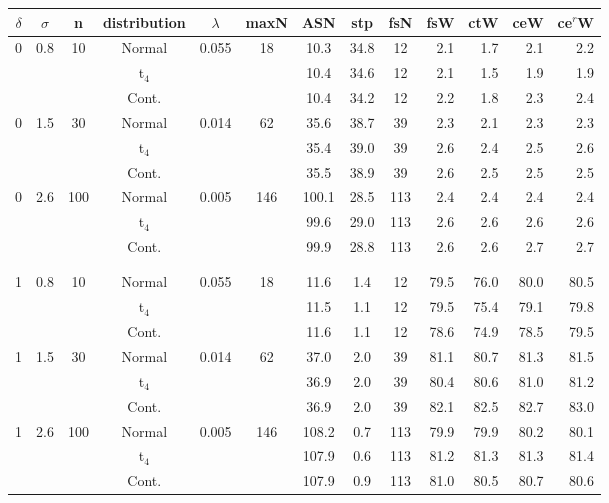 \begin{tabular}{cccccccccrrrr}

\toprule
\multicolumn{1}{c}{$\delta$}&\multicolumn{1}{c}{$\sigma$}&\multicolumn{1}{c}{n}&\multicolumn{1}{c}{distribution}&\multicolumn{1}{c}{$\lambda$}&\multicolumn{1}{c}{maxN}&\multicolumn{1}{c}{ASN}&\multicolumn{1}{c}{stp}&\multicolumn{1}{c}{fsN}&\multicolumn{1}{r}{fsW}&\multicolumn{1}{r}{ctW}&\multicolumn{1}{r}{ceW}&\multicolumn{1}{r}{ce$^r$W}\\
\midrule
0  &  0.8  &   10  &  Normal  &  0.055  &   18  &  10.3  &  34.8  &   12  &  2.1  &  1.7  &  2.1  &  2.2\\
   &     &     &  t$_4$  &     &     &  10.4  &  34.6  &   12  &  2.1  &  1.5  &  1.9  &  1.9\\
   &     &     &  Cont.  &     &     &  10.4  &  34.2  &   12  &  2.2  &  1.8  &  2.3  &  2.4\\
0  &  1.5  &   30  &  Normal  &  0.014  &   62  &  35.6  &  38.7  &   39  &  2.3  &  2.1  &  2.3  &  2.3\\
   &     &     &  t$_4$  &     &     &  35.4  &  39.0  &   39  &  2.6  &  2.4  &  2.5  &  2.6\\
   &     &     &  Cont.  &     &     &  35.5  &  38.9  &   39  &  2.6  &  2.5  &  2.5  &  2.5\\
0  &  2.6  &  100  &  Normal  &  0.005  &  146  &  100.1  &  28.5  &  113  &  2.4  &  2.4  &  2.4  &  2.4\\
   &     &     &  t$_4$  &     &     &  99.6  &  29.0  &  113  &  2.6  &  2.6  &  2.6  &  2.6\\
   &     &     &  Cont.  &     &     &  99.9  &  28.8  &  113  &  2.6  &  2.6  &  2.7  &  2.7\\
\\\hline\\ 1  &  0.8  &   10  &  Normal  &  0.055  &   18  &  11.6  &  1.4  &   12  &  79.5  &  76.0  &  80.0  &  80.5\\
   &     &     &  t$_4$  &     &     &  11.5  &  1.1  &   12  &  79.5  &  75.4  &  79.1  &  79.8\\
   &     &     &  Cont.  &     &     &  11.6  &  1.1  &   12  &  78.6  &  74.9  &  78.5  &  79.5\\
1  &  1.5  &   30  &  Normal  &  0.014  &   62  &  37.0  &  2.0  &   39  &  81.1  &  80.7  &  81.3  &  81.5\\
   &     &     &  t$_4$  &     &     &  36.9  &  2.0  &   39  &  80.4  &  80.6  &  81.0  &  81.2\\
   &     &     &  Cont.  &     &     &  36.9  &  2.0  &   39  &  82.1  &  82.5  &  82.7  &  83.0\\
1  &  2.6  &  100  &  Normal  &  0.005  &  146  &  108.2  &  0.7  &  113  &  79.9  &  79.9  &  80.2  &  80.1\\
   &     &     &  t$_4$  &     &     &  107.9  &  0.6  &  113  &  81.2  &  81.3  &  81.3  &  81.4\\
   &     &     &  Cont.  &     &     &  107.9  &  0.9  &  113  &  81.0  &  80.5  &  80.7  &  80.6\\
\bottomrule

\end{tabular}
